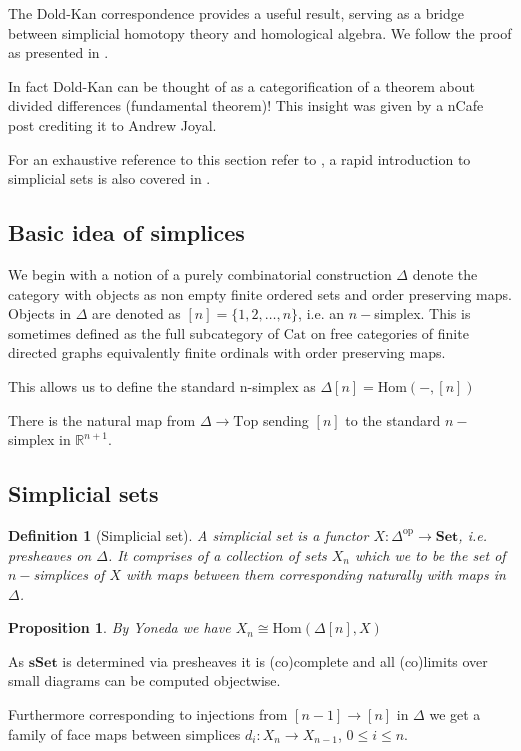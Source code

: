 \documentclass[12pt]{article}
\numberwithin{equation}{section}
\newcommand{\R}{\mathbb{R}}
\newcommand{\Hom}{{\mathrm{Hom}}}
\newtheorem{definition}{Definition}[section]
\newtheorem{proposition}{Proposition}[section]
\begin{document}
	The Dold-Kan correspondence provides a useful result, serving as a bridge between simplicial homotopy theory and homological algebra. We follow the proof as presented in \cite{Goerss_Jardine_2009}.	
	
	In fact Dold-Kan can be thought of as a categorification of a theorem about divided differences (fundamental theorem)! This insight was given by a nCafe post \cite{ncafedk} crediting it to Andrew Joyal.
	
	For an exhaustive reference to this section refer to \cite{Goerss_Jardine_2009}, a rapid introduction to simplicial sets is also covered in \cite{Riehl2011ALI}.
	\subsection{Basic idea of simplices}
	We begin with a notion of a purely combinatorial construction $\Delta$ denote the category with objects as non empty finite ordered sets and order preserving maps. Objects in $\Delta$ are denoted as $[n]=\{1,2,\dots,n\}$, i.e. an $n-$simplex. This is sometimes defined as the full subcategory of $\mathrm{Cat}$ on free categories of finite directed graphs equivalently finite ordinals with order preserving maps.
	
	
	This allows us to define the standard n-simplex as $\Delta[n]=\Hom(-,[n])$
	
	There is the natural map from $\Delta \to \mathrm{Top}$ sending $[n]$ to the standard $n-$simplex in $\R^{n+1}$.
	
	\subsection{Simplicial sets}
	
	\begin{definition}[Simplicial set]
		A simplicial set is a functor $X: \Delta^\mathrm{op} \to \mathbf{Set}$, i.e. presheaves on $\Delta$. It comprises of a collection of sets $X_n$ which we to be the set of $n-$simplices of $X$ with maps between them corresponding naturally with maps in $\Delta$.
	\end{definition}
	\begin{proposition}
		By Yoneda we have $X_n\cong \Hom(\Delta[n],X)$
	\end{proposition}
	As $\mathbf{sSet}$ is determined via presheaves it is (co)complete and all (co)limits over small diagrams can be computed objectwise. 
	
	Furthermore corresponding to injections from $[n-1] \to [n]$ in $\Delta$ we get a family of face maps between simplices $d_i:X_n \to X_{n-1}$, $0\leq i \leq n$.
	
\end{document}
